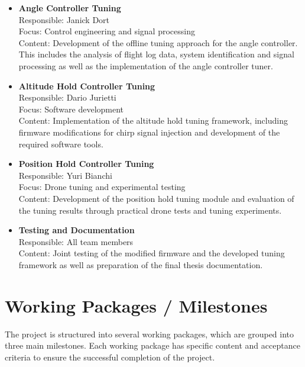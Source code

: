 \documentclass[a4paper,11pt,bibliography=totoc,listof=totoc]{scrreprt}
\begin{document}
\begin{itemize}

\item \textbf{Angle Controller Tuning} \\
Responsible: Janick Dort \\
Focus: Control engineering and signal processing \\
Content: Development of the offline tuning approach for the angle
controller. This includes the analysis of flight log data, system
identification and signal processing as well as the implementation
of the angle controller tuner.

\item \textbf{Altitude Hold Controller Tuning} \\
Responsible: Dario Jurietti \\
Focus: Software development \\
Content: Implementation of the altitude hold tuning framework, including
firmware modifications for chirp signal injection and development of the
required software tools.

\item \textbf{Position Hold Controller Tuning} \\
Responsible: Yuri Bianchi \\
Focus: Drone tuning and experimental testing \\
Content: Development of the position hold tuning module and evaluation of
the tuning results through practical drone tests and tuning experiments.

\item \textbf{Testing and Documentation} \\
Responsible: All team members \\
Content: Joint testing of the modified firmware and the developed tuning
framework as well as preparation of the final thesis documentation.

\end{itemize}

\newpage

\section{Working Packages / Milestones}

The project is structured into several working packages, which are grouped into three main milestones. Each working package 
has specific content and acceptance criteria to ensure the successful completion of the project.
\end{document}
